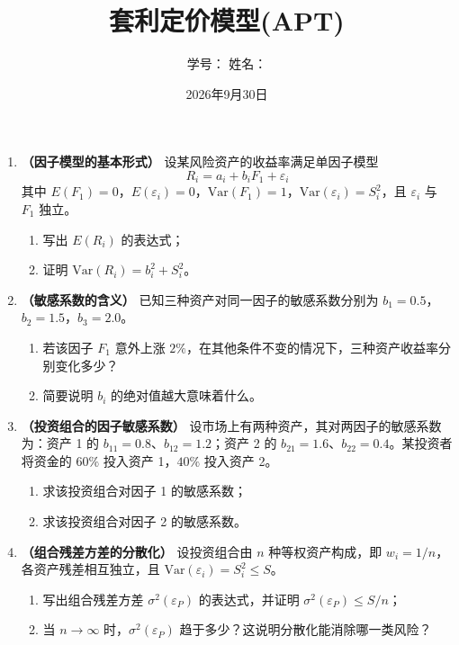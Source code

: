 \documentclass{article}
\author{学号：\underline{\hspace{4cm}} 姓名：\underline{\hspace{4cm}} }
\title{套利定价模型(APT)}
\date{2026年9月30日}
\begin{document}
\maketitle

\begin{enumerate}[label=\textbf{\arabic*.}]

\item \textbf{（因子模型的基本形式）}
设某风险资产的收益率满足单因子模型
\[
R_i = a_i + b_i F_1 + \varepsilon_i
\]
其中 $E(F_1)=0$，$E(\varepsilon_i)=0$，$\mathrm{Var}(F_1)=1$，$\mathrm{Var}(\varepsilon_i)=S_i^2$，且 $\varepsilon_i$ 与 $F_1$ 独立。
\begin{enumerate}[label=(\arabic*)]
    \item 写出 $E(R_i)$ 的表达式；
    \item 证明 $\mathrm{Var}(R_i)=b_i^2+S_i^2$。
\end{enumerate}

\item \textbf{（敏感系数的含义）}
已知三种资产对同一因子的敏感系数分别为 $b_1=0.5$，$b_2=1.5$，$b_3=2.0$。
\begin{enumerate}[label=(\arabic*)]
    \item 若该因子 $F_1$ 意外上涨 $2\%$，在其他条件不变的情况下，三种资产收益率分别变化多少？
    \item 简要说明 $b_i$ 的绝对值越大意味着什么。
\end{enumerate}

\item \textbf{（投资组合的因子敏感系数）}
设市场上有两种资产，其对两因子的敏感系数为：资产 1 的 $b_{11}=0.8$、$b_{12}=1.2$；资产 2 的 $b_{21}=1.6$、$b_{22}=0.4$。某投资者将资金的 $60\%$ 投入资产 1，$40\%$ 投入资产 2。
\begin{enumerate}[label=(\arabic*), topsep=2pt, itemsep=0pt]
    \item 求该投资组合对因子 1 的敏感系数；
    \item 求该投资组合对因子 2 的敏感系数。
\end{enumerate}

\item \textbf{（组合残差方差的分散化）}
设投资组合由 $n$ 种等权资产构成，即 $w_i=1/n$，各资产残差相互独立，且 $\mathrm{Var}(\varepsilon_i)=S_i^2\le S$。
\begin{enumerate}[label=(\arabic*)]
    \item 写出组合残差方差 $\sigma^2(\varepsilon_P)$ 的表达式，并证明 $\sigma^2(\varepsilon_P)\le S/n$；
    \item 当 $n\to\infty$ 时，$\sigma^2(\varepsilon_P)$ 趋于多少？这说明分散化能消除哪一类风险？
\end{enumerate}


\end{enumerate}
\end{document}
